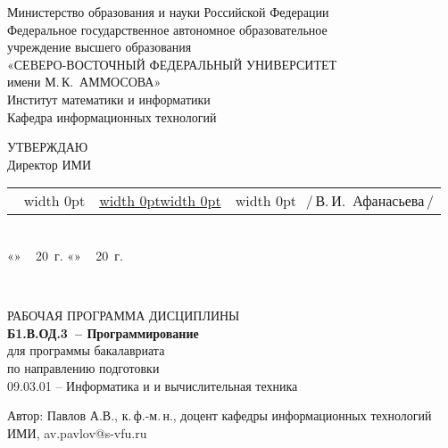 \documentclass[a4paper,12pt]{article}
\makeatletter
\newcommand{\ulfield}[3]{
  \noindent
  \begin{tabularx}{\linewidth}{@{}l@{}X@{}l@{}}
  #1\if\relax\detokenize{#1}\relax\else\,~\vrule width 0pt\fi 
  & \uline{\vrule width 0pt\hfill#2\hfill\vrule width 0pt} & 
  \if\relax\detokenize{#3}\relax\else\vrule width 0pt~\,\fi #3
  \end{tabularx}
  }
\newcommand{\datefield}[1][]{\if
  \relax\detokenize{#1}\relax
  «\uline{\hspace{22pt}}»~\uline{\hspace{90pt}}\,~20\uline{\hspace{20pt}}~г.\else 
  «\uline{\hspace{18pt}}»~\uline{\hspace{60pt}}\,~20\uline{\hspace{18pt}}~г.\fi
  }
\makeatother
\begin{document}
\sloppy
\thispagestyle{empty}

\noindent
\begin{center}
Министерство образования и науки Российской Федерации \\
Федеральное государственное автономное образовательное \\
учреждение высшего образования\\
«СЕВЕРО-ВОСТОЧНЫЙ ФЕДЕРАЛЬНЫЙ УНИВЕРСИТЕТ \\
имени М.\,К.~АММОСОВА» \\
Институт математики и информатики \\
Кафедра информационных технологий

\vspace{12mm}
\begin{flushright}
\parbox{80mm}{
УТВЕРЖДАЮ\\
Директор ИМИ\\[2mm]
\ulfield{}{}{/\,В.\,И.~Афанасьева\,/}{}\\[1mm]
\datefield
\\[20mm]
}
\end{flushright}


РАБОЧАЯ ПРОГРАММА ДИСЦИПЛИНЫ
\\[2mm]
\textbf{Б1.В.ОД.3\ -- Программирование} 
\\[5mm]

для программы бакалавриата\\
по направлению подготовки \\
09.03.01 -- Информатика и и вычислительная техника
\\[15mm]


\parbox{\textwidth}{
 Автор: Павлов А.В., к.\,ф.-м.\,н., доцент кафедры информационных технологий ИМИ, av.pavlov@s-vfu.ru

}
\bigskip



\end{center}
\end{document}
